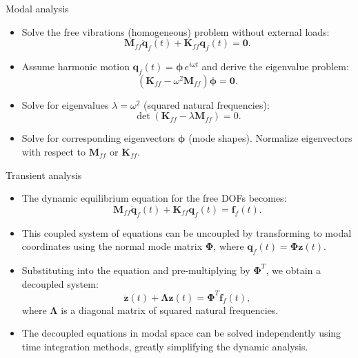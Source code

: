 \documentclass[aspectratio=169]{beamer}
\begin{document}
\begin{frame}{Modal analysis}
  \begin{itemize}
    \item Solve the free vibrations (homogeneous) problem without external loads:
          \[
            \mathbf{M}_{ff} \ddot{\mathbf{q}}_f(t) + \mathbf{K}_{ff} \mathbf{q}_f(t) = \mathbf{0}.
          \]
    \item Assume harmonic motion $\mathbf{q}_f(t) = \boldsymbol{\phi} \, e^{i \omega t}$ and derive the eigenvalue problem:
          \[
            \left( \mathbf{K}_{ff} - \omega^2 \mathbf{M}_{ff} \right) \boldsymbol{\phi} = \mathbf{0}.
          \]
    \item Solve for eigenvalues $\lambda=\omega^2$ (squared natural frequencies):
          \[
            \det\left( \mathbf{K}_{ff} - \lambda \mathbf{M}_{ff} \right) = 0.
          \]
    \item Solve for corresponding eigenvectors $\boldsymbol{\phi}$ (mode shapes). Normalize eigenvectors with respect to $\mathbf{M}_{ff}$ or $\mathbf{K}_{ff}$.
  \end{itemize}
\end{frame}

\begin{frame}{Transient analysis}
  \begin{itemize}
    \item The dynamic equilibrium equation for the free DOFs becomes:
          \[
            \mathbf{M}_{ff} \ddot{\mathbf{q}}_{f}(t) + \mathbf{K}_{ff} \mathbf{q}_{f}(t) = \mathbf{f}_{f}(t).
          \]
    \item This coupled system of equations can be uncoupled by transforming to modal coordinates using the normal mode matrix $\boldsymbol{\Phi}$, where $\mathbf{q}_f(t) = \boldsymbol{\Phi} \mathbf{z}(t)$.
    \item Substituting into the equation and pre-multiplying by $\boldsymbol{\Phi}^T$, we obtain a decoupled system:
          \[
            \ddot{\mathbf{z}}(t) + \boldsymbol{\Lambda} \mathbf{z}(t) = \boldsymbol{\Phi}^T \mathbf{f}_f(t),
          \]
          where $\boldsymbol{\Lambda}$ is a diagonal matrix of squared natural frequencies.
    \item The decoupled equations in modal space can be solved independently using time integration methods, greatly simplifying the dynamic analysis.
  \end{itemize}
\end{frame}
\end{document}
